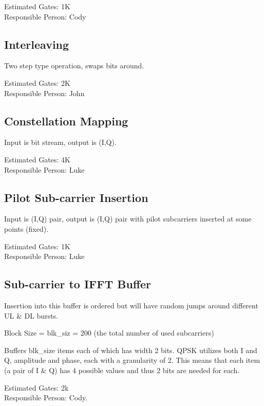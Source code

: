 \documentclass[dvips,10pt,twocolumn]{article}
\begin{document}
	Estimated Gates: 1K \\
	Responsible Person: Cody

	\subsection{Interleaving}
	\label{sec:interleaving}

	Two step type operation, swaps bits around.

	Estimated Gates: 2K \\
	Responsible Person: John

	\subsection{Constellation Mapping}
	\label{sec:constellation}

	Input is bit stream, output is (I,Q).
	
	Estimated Gates: 4K \\
	Responsible Person: Luke

	\subsection{Pilot Sub-carrier Insertion}
	\label{sec:pilot}

	Input is (I,Q) pair, output is (I,Q) pair with pilot subcarriers
	inserted at some points (fixed).

	Estimated Gates: 1K \\
	Responsible Person: Luke

	\subsection{Sub-carrier to IFFT Buffer}
	\label{sec:ifft-buffer}
	Insertion into this buffer is ordered but will have random
	jumps around different UL \& DL bursts.

	Block Size = blk\_siz = 200 (the total number of used
	subcarriers)
	
	Buffers blk\_size items each of which has width 2 bits.
	QPSK utilizes both I and Q, amplitude and phase, each with
	a granularity of 2. This means that each item (a pair of I
	\& Q) has 4 possible values and thus 2 bits are needed for
	each.

	Estimated Gates: 2k \\
	Responsible Person: Cody.
\end{document}
